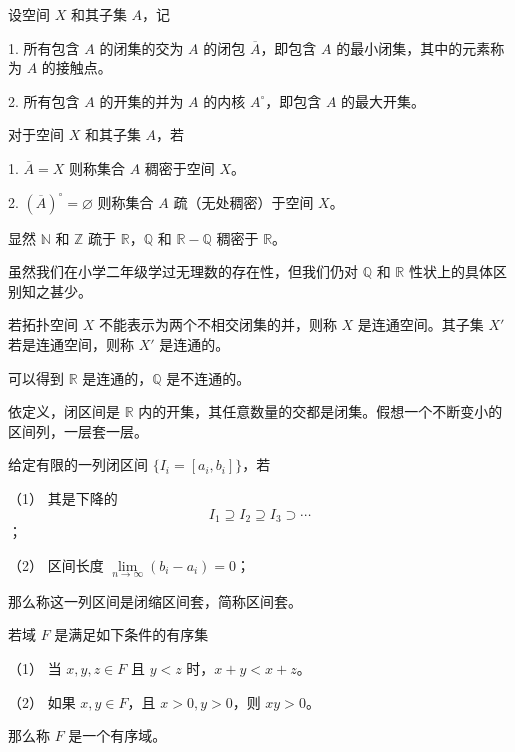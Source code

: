 \begin{definition}[闭包，内核]
	设空间 $X$ 和其子集 $A$，记

	1. 所有包含 $A$ 的闭集的交为 $A$ 的闭包 $\overline{A}$，即包含 $A$ 的最小闭集，其中的元素称为 $A$ 的接触点。

	2. 所有包含 $A$ 的开集的并为 $A$ 的内核 $A^{\circ}$，即包含 $A$ 的最大开集。
\end{definition}

\begin{definition}
	对于空间 $X$ 和其子集 $A$，若

	1. $\overline{A} = X$ 则称集合 $A$ 稠密于空间 $X$。

	2. $(\overline{A})^{\circ} = \varnothing$ 则称集合 $A$ 疏（无处稠密）于空间 $X$。
\end{definition}

显然 $\mathbb{N}$ 和 $\mathbb{Z}$ 疏于 $\mathbb{R}$，$\mathbb{Q}$ 和 $\mathbb{R} - \mathbb{Q}$ 稠密于 $\mathbb{R}$。

虽然我们在小学二年级学过无理数的存在性，但我们仍对 $\mathbb{Q}$ 和 $\mathbb{R}$ 性状上的具体区别知之甚少。

\begin{definition}[连通]
	若拓扑空间 $X$ 不能表示为两个不相交闭集的并，则称 $X$ 是连通空间。其子集 $X'$ 若是连通空间，则称 $X'$ 是连通的。
\end{definition}

可以得到 $\mathbb{R}$ 是连通的，$\mathbb{Q}$ 是不连通的。

依定义，闭区间是 $\mathbb{R}$ 内的开集，其任意数量的交都是闭集。假想一个不断变小的区间列，一层套一层。

\begin{definition}[闭区间套]
	给定有限的一列闭区间 $\{ I_i = [a_i, b_i] \}$，若

	（1） 其是下降的
	\[ I_1 \supseteq I_2  \supseteq I_3  \supset \cdots \]；

	（2） 区间长度 $\lim\limits_{n \to \infty} (b_i - a_i) = 0$；

	那么称这一列区间是闭缩区间套，简称区间套。
\end{definition}

\begin{definition}[有序域]
	若域 $F$ 是满足如下条件的有序集

	（1） 当 $x,y,z\in F$ 且 $y<z$ 时，$x+y<x+z$。

	（2） 如果 $x,y\in F$，且 $x>0,y>0$，则 $xy>0$。

	那么称 $F$ 是一个有序域。
\end{definition}

